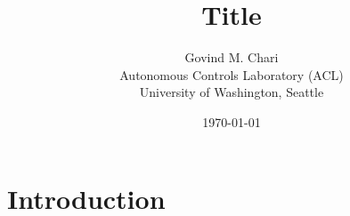 \documentclass[11pt,a4paper]{article}
\title{\Large{\textbf{\sffamily Title\\}}\vspace{0.5em}}
\author{Govind M. Chari\\Autonomous Controls Laboratory (ACL)\\University of Washington, Seattle}
\date{\today}
\begin{document}
\maketitle

\section{Introduction}
\end{document}
